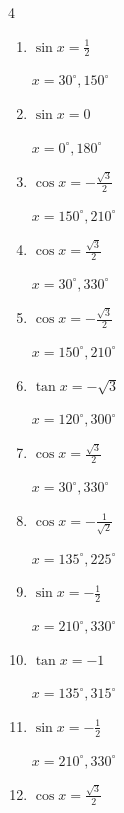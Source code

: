 \begin{multicols}{4}
\begin{enumerate}
  \item $\displaystyle \sin{x}  = \frac{1}{2}$

        $\displaystyle x = 30^{\circ} , 150^{\circ}$

  \item $\displaystyle \sin{x}  = 0$

        $\displaystyle x = 0^{\circ} , 180^{\circ}$

\columnbreak %

\resetques

  \item $\displaystyle \cos{x}  = -\frac{\sqrt{3}}{2}$

        $\displaystyle x = 150^{\circ} , 210^{\circ}$

  \item $\displaystyle \cos{x}  = \frac{\sqrt{3}}{2}$

        $\displaystyle x = 30^{\circ} , 330^{\circ}$

  \item $\displaystyle \cos{x}  = -\frac{\sqrt{3}}{2}$

        $\displaystyle x = 150^{\circ} , 210^{\circ}$

  \item $\displaystyle \tan{x}  = -\sqrt{3}$

        $\displaystyle x = 120^{\circ} , 300^{\circ}$

  \item $\displaystyle \cos{x}  = \frac{\sqrt{3}}{2}$

        $\displaystyle x = 30^{\circ} , 330^{\circ}$

  \item $\displaystyle \cos{x}  = -\frac{1}{\sqrt{2}}$

        $\displaystyle x = 135^{\circ} , 225^{\circ}$

  \item $\displaystyle \sin{x}  = -\frac{1}{2}$

        $\displaystyle x = 210^{\circ} , 330^{\circ}$

  \item $\displaystyle \tan{x}  = -1$

        $\displaystyle x = 135^{\circ} , 315^{\circ}$

  \item $\displaystyle \sin{x}  = -\frac{1}{2}$

        $\displaystyle x = 210^{\circ} , 330^{\circ}$

  \item $\displaystyle \cos{x}  = \frac{\sqrt{3}}{2}$


\end{enumerate}
\end{multicols}
